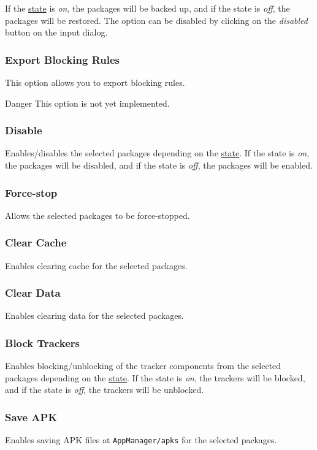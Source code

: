 If the \hyperref[subsubsec:profile-state]{state} is \textit{on}, the packages will be backed up, and if the state is
\textit{off}, the packages will be restored. The option can be disabled by clicking on the \textit{disabled} button on
the input dialog.

\subsubsection{Export Blocking Rules}
This option allows you to export blocking rules.

\begin{danger}{Danger}
    This option is not yet implemented.
\end{danger}

\subsubsection{Disable}
Enables/disables the selected packages depending on the \hyperref[subsubsec:profile-state]{state}. If the state is
\textit{on}, the packages will be disabled, and if the state is \textit{off}, the packages will be enabled.

\subsubsection{Force-stop}
Allows the selected packages to be force-stopped.

\subsubsection{Clear Cache}
Enables clearing cache for the selected packages.

\subsubsection{Clear Data}
Enables clearing data for the selected packages.

\subsubsection{Block Trackers}
Enables blocking/unblocking of the tracker components from the selected packages depending on the
\hyperref[subsubsec:profile-state]{state}. If the state is \textit{on}, the trackers will be blocked, and if the state
is \textit{off}, the trackers will be unblocked.

\subsubsection{Save APK}
Enables saving APK files at \texttt{AppManager/apks} for the selected packages.
